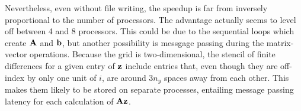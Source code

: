 \documentclass{article}
\begin{document}
Nevertheless, even without file writing, the speedup is far from inversely proportional to the number of processors. The advantage actually seems to level off between 4 and 8 processors. This could be due to the sequential loops which create $\vb{A}$ and $\vb{b}$, but another possibility is messgage passing during the matrix-vector operations. Because the grid is two-dimensional, the stencil of finite differences for a given entry of $\vb{z}$ include entries that, even though they are off-index by only one unit of $i$, are around $3 n_{y}$ spaces away from each other. This makes them likely to be stored on separate processes, entailing message passing latency for each calculation of $\vb{A} \vb{z}$.
\end{document}
